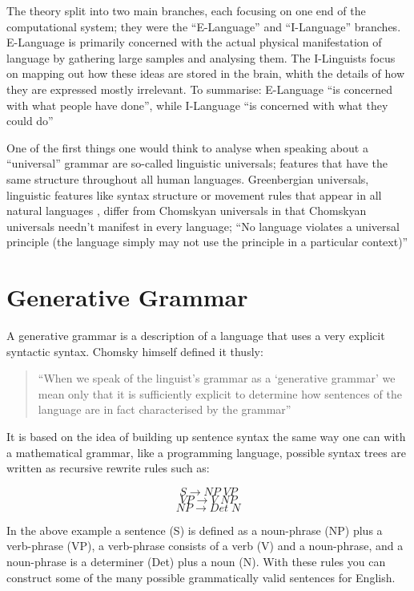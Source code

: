 \documentclass[a4paper,10pt]{article}
\newcommand{\mli}[1]{\mathit{#1}}
\begin{document}
The theory split into two main branches, each focusing on one end of the computational system;
they were the ``E-Language'' and ``I-Language'' branches. E-Language is primarily concerned with
the actual physical manifestation of language by gathering large samples and analysing them. The
I-Linguists focus on mapping out how these ideas are stored in the brain, whith the details of
how they are expressed mostly irrelevant. To summarise: E-Language ``is concerned with what people
have done'', while I-Language ``is concerned with what they could do'' \citep[p.~14]{ChUGAI}

One of the first things one would think to analyse when speaking about a ``universal'' grammar
are so-called linguistic universals; features that have the same structure throughout all human
languages. Greenbergian universals, linguistic features like syntax structure or movement rules
that appear in all natural languages \citep{Greenberg473}, differ from Chomskyan universals in that
Chomskyan universals needn't manifest in every language; ``No language violates a universal principle
(the language simply may not use the principle in a particular context)'' \citep[p.~23]{ChUGAI}


\section{Generative Grammar}
A generative grammar is a description of a language that uses a very explicit syntactic syntax.
Chomsky himself defined it thusly:

\begin{quote}
	``When we speak of the linguist's grammar as a `generative grammar' we mean only that it is
	sufficiently explicit to determine how sentences of the language are in fact characterised
	by the grammar''
	
	\citet[p.~220]{Chomsky80}
\end{quote}

It is based on the idea of building up sentence syntax the same way one can with
a mathematical grammar, like a programming language, possible syntax trees are written as recursive
rewrite rules such as:

\[        S \rightarrow \mli{NP} \; \mli{VP} \]
\[ \mli{VP} \rightarrow V        \; \mli{NP} \]
\[ \mli{NP} \rightarrow Det      \; N        \]

In the above example a sentence (S) is defined as a noun-phrase (NP) plus a verb-phrase (VP),
a verb-phrase consists of a verb (V) and a noun-phrase, and a noun-phrase is a determiner (Det) plus
a noun (N). With these rules you can construct some of the many possible grammatically valid sentences
for English. \citep[p.~32]{ChUGAI}
\end{document}
